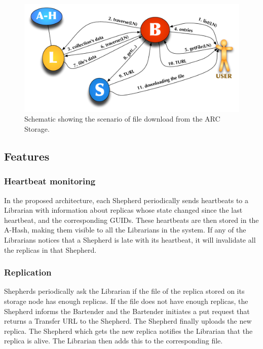\documentclass[final]{ieee}
\begin{document}
\begin{figure}
\centering
\includegraphics[width=1.0\columnwidth]{arc1-storage-downloading.pdf}
\caption{Schematic showing the scenario of file download from the ARC Storage.}
\label{arc1-storage-downloading}
\end{figure}  


\subsection{Features}
\subsubsection{Heartbeat monitoring}
\label{Heartbeat and Replication}
In the proposed architecture, each Shepherd periodically sends
heartbeats to a Librarian with information about replicas
whose state changed since the last heartbeat, and the corresponding
GUIDs. These heartbeats are then stored in the A-Hash, making them
visible to all the Librarians in the system. If any of the Librarians
notices that a Shepherd is late with its heartbeat, it will invalidate
all the replicas in that Shepherd.  

\subsubsection{Replication}
\label{Replication}
Shepherds periodically ask the Librarian if the file of the replica stored on
its storage node has enough replicas. If the file does not have
enough replicas, the Shepherd informs the Bartender and the Bartender initiates
a put request that returns a Transfer URL to the Shepherd. The
Shepherd finally uploads the new replica. The Shepherd which gets the new replica notifies the
Librarian that the replica is alive. The Librarian then adds this to
the corresponding file.
\end{document}
